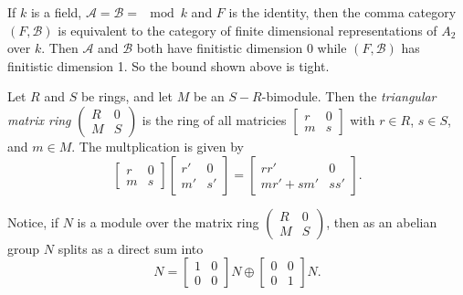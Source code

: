 \begin{example}
	If $k$ is a field, $\mathcal A = \mathcal B = \mod k$ and $F$ is the identity, then the comma category $(F, \mathcal B)$ is equivalent to the category of finite dimensional representations of $A_2$ over $k$. Then $\mathcal A$ and $\mathcal B$ both have finitistic dimension 0 while $(F, \mathcal B)$ has finitistic dimension 1. So the bound shown above is tight. 
\end{example}

\begin{defn}
	Let $R$ and $S$ be rings, and let $M$ be an $S-R$-bimodule. Then the \emph{triangular matrix ring} $\begin{pmatrix}
	R & 0\\
	M & S
	\end{pmatrix}$ is the ring of all matricies $\begin{bmatrix}
	r & 0\\
	m & s
	\end{bmatrix}$ with $r\in R$, $s\in S$, and $m\in M$. The multplication is given by
	$$\begin{bmatrix}
	r & 0\\
	m & s
	\end{bmatrix}\begin{bmatrix}
	r' & 0\\
	m' & s'
	\end{bmatrix}=\begin{bmatrix}
	rr' & 0\\
	mr' + sm' & ss'
	\end{bmatrix}.$$
\end{defn}

Notice, if $N$ is a module over the matrix ring $\begin{pmatrix}
R & 0\\
M & S
\end{pmatrix}$, then as an abelian group $N$ splits as a direct sum into
$$N=
\begin{bmatrix}
1 & 0\\
0 & 0
\end{bmatrix}N \oplus
\begin{bmatrix}
0 & 0\\
0 & 1
\end{bmatrix}N.$$

